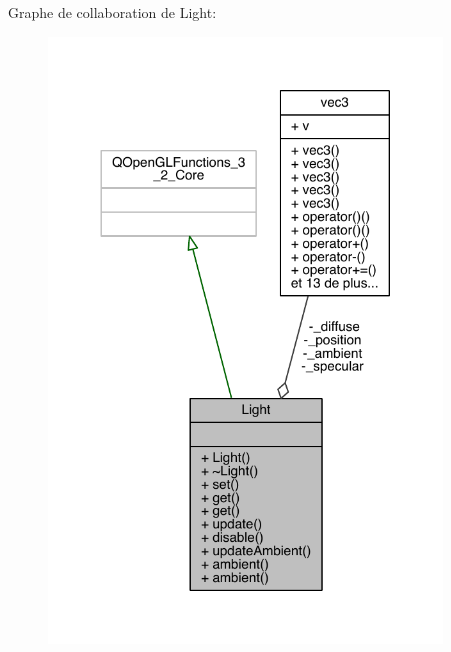 Graphe de collaboration de Light\+:
\nopagebreak
\begin{figure}[H]
\begin{center}
\leavevmode
\includegraphics[width=296pt]{class_light__coll__graph}
\end{center}
\end{figure}
